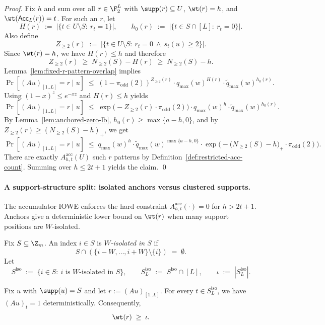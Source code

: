 \begin{proof}
Fix $h$ and sum over all $r\in\F_2^L$ with $\supp(r)\subseteq U$, $\wt(r)=h$, and $\wt({\sf Acc}_L(r))=t$.
For such an $r$, let
\[
H(r) \;:=\; |\{t\in U\setminus S:\ r_t=1\}|,
\qquad
h_0(r) \;:=\; |\{t\in S\cap[L]:\ r_t=0\}|.
\]
Also define
\[
Z_{\ge 2}(r) \;:=\; |\{t\in U\setminus S:\ r_t=0\ \wedge\ s_t(u)\ge 2\}|.
\]
Since $\wt(r)=h$, we have $H(r)\le h$ and therefore
\[
Z_{\ge 2}(r)\;\ge\; N_{\ge 2}(S)-H(r)\;\ge\; N_{\ge 2}(S)-h.
\]
Lemma~\ref{lem:fixed-r-pattern-overlap} implies
\[
\Pr[(Au)_{[1..L]}=r\mid u]
\;\le\;
(1-\pi_{\mathrm{odd}}(2))^{Z_{\ge 2}(r)}\cdot q_{\max}(w)^{H(r)}\cdot \widetilde q_{\max}(w)^{h_0(r)}.
\]
Using $(1-x)^z\le e^{-xz}$ and $H(r)\le h$ yields
\[
\Pr[(Au)_{[1..L]}=r\mid u]
\;\le\;
\exp\!\big(-Z_{\ge 2}(r)\cdot \pi_{\mathrm{odd}}(2)\big)\cdot q_{\max}(w)^{h}\cdot \widetilde q_{\max}(w)^{h_0(r)}.
\]
By Lemma~\ref{lem:anchored-zero-lb}, $h_0(r)\ge \max\{a-h,0\}$, and by $Z_{\ge 2}(r)\ge (N_{\ge 2}(S)-h)_+$, we get
\[
\Pr[(Au)_{[1..L]}=r\mid u]
\;\le\;
q_{\max}(w)^{h}\cdot \widetilde q_{\max}(w)^{\max\{a-h,0\}}\cdot
\exp\!\big(-\big(N_{\ge 2}(S)-h\big)_+\cdot \pi_{\mathrm{odd}}(2)\big).
\]
There are exactly $A^{\mathrm{acc}}_{h,t}(U)$ such $r$ patterns by Definition~\ref{def:restricted-acc-count}.
Summing over $h\le 2t+1$ yields the claim.
\qed
\end{proof}

\paragraph{A support-structure split: isolated anchors versus clustered supports.}
The accumulator IOWE enforces the hard constraint $A^{\mathrm{acc}}_{h,t}(\cdot)=0$ for $h>2t+1$.
Anchors give a deterministic lower bound on $\wt(r)$ when many support positions are $W$-isolated.

\begin{definition}
\label{def:W-isolated}
Fix $S\subseteq \Z_m$. An index $i\in S$ is \emph{$W$-isolated in $S$} if
\[
S\cap (\{i-W,\dots,i+W\}\setminus\{i\}) \;=\; \emptyset.
\]
Let
\[
S^{\mathrm{iso}} \;:=\; \{i\in S:\ i \text{ is $W$-isolated in } S\},
\qquad
S^{\mathrm{iso}}_L \;:=\; S^{\mathrm{iso}}\cap [L],
\qquad
\iota \;:=\; |S^{\mathrm{iso}}_L|.
\]
\end{definition}

\begin{lemma}
\label{lem:iso-forces-ones}
Fix $u$ with $\supp(u)=S$ and let $r:=(Au)_{[1..L]}$.
For every $t\in S^{\mathrm{iso}}_L$, we have $(Au)_t=1$ deterministically.
Consequently,
\[
\wt(r) \;\ge\; \iota.
\]
\end{lemma}


